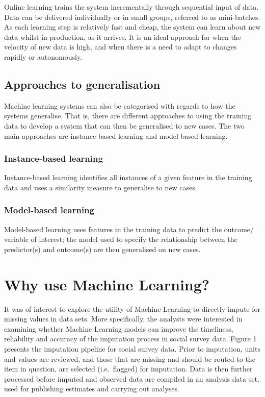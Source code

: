 \documentclass[]{book}
\begin{document}
Online learning trains the system incrementally through sequential input
of data. Data can be delivered individually or in small groups, referred
to as mini-batches. As each learning step is relatively fast and cheap,
the system can learn about new data whilst in production, as it arrives.
It is an ideal approach for when the velocity of new data is high, and
when there is a need to adapt to changes rapidly or autonomously.

\section{Approaches to
generalisation}\label{approaches-to-generalisation}

Machine learning systems can also be categorised with regards to how the
systems generalise. That is, there are different approaches to using the
training data to develop a system that can then be generalised to new
cases. The two main approaches are instance-based learning and
model-based learning.

\subsection{Instance-based learning}\label{instance-based-learning}

Instance-based learning identifies all instances of a given feature in
the training data and uses a similarity measure to generalise to new
cases.

\subsection{Model-based learning}\label{model-based-learning}

Model-based learning uses features in the training data to predict the
outcome/ variable of interest; the model used to specify the
relationship between the predictor(s) and outcome(s) are then
generalised on new cases.

\chapter{Why use Machine Learning?}\label{why-use-machine-learning}

It was of interest to explore the utility of Machine Learning to
directly impute for missing values in data sets. More specifically, the
analysts were interested in examining whether Machine Learning models
can improve the timeliness, reliability and accuracy of the imputation
process in social survey data. Figure 1 presents the imputation pipeline
for social survey data. Prior to imputation, units and values are
reviewed, and those that are missing and should be routed to the item in
question, are selected (i.e.~flagged) for imputation. Data is then
further processed before imputed and observed data are compiled in an
analysis data set, used for publishing estimates and carrying out
analyses.
\end{document}
